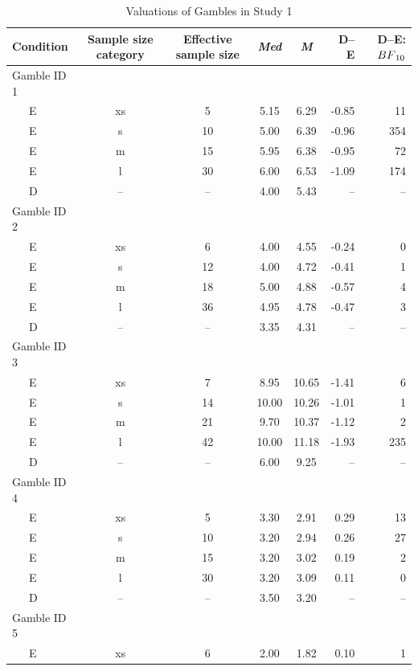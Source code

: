 \documentclass[a4paper, man, floatsintext]{apa6}
\begin{document}
\begin{table}[tbp]
\begin{center}
\begin{threeparttable}
\caption{\label{tab:means_study2}Valuations of Gambles in Study 1}
\begin{tabular}{lccccrr}
\toprule
Condition & Sample size category & Effective sample size & \textit{Med} & \textit{M} & D--E & D--E:$BF\textsubscript{10}$\\
\midrule
Gamble ID 1 &  &  &  &  &  & \\
\ \ \ E & xs & 5 & 5.15 & 6.29 & -0.85 & 11\\
\ \ \ E & s & 10 & 5.00 & 6.39 & -0.96 & 354\\
\ \ \ E & m & 15 & 5.95 & 6.38 & -0.95 & 72\\
\ \ \ E & l & 30 & 6.00 & 6.53 & -1.09 & 174\\
\ \ \ D & -- & -- & 4.00 & 5.43 & -- & --\\
Gamble ID 2 &  &  &  &  &  & \\
\ \ \ E & xs & 6 & 4.00 & 4.55 & -0.24 & 0\\
\ \ \ E & s & 12 & 4.00 & 4.72 & -0.41 & 1\\
\ \ \ E & m & 18 & 5.00 & 4.88 & -0.57 & 4\\
\ \ \ E & l & 36 & 4.95 & 4.78 & -0.47 & 3\\
\ \ \ D & -- & -- & 3.35 & 4.31 & -- & --\\
Gamble ID 3 &  &  &  &  &  & \\
\ \ \ E & xs & 7 & 8.95 & 10.65 & -1.41 & 6\\
\ \ \ E & s & 14 & 10.00 & 10.26 & -1.01 & 1\\
\ \ \ E & m & 21 & 9.70 & 10.37 & -1.12 & 2\\
\ \ \ E & l & 42 & 10.00 & 11.18 & -1.93 & 235\\
\ \ \ D & -- & -- & 6.00 & 9.25 & -- & --\\
Gamble ID 4 &  &  &  &  &  & \\
\ \ \ E & xs & 5 & 3.30 & 2.91 & 0.29 & 13\\
\ \ \ E & s & 10 & 3.20 & 2.94 & 0.26 & 27\\
\ \ \ E & m & 15 & 3.20 & 3.02 & 0.19 & 2\\
\ \ \ E & l & 30 & 3.20 & 3.09 & 0.11 & 0\\
\ \ \ D & -- & -- & 3.50 & 3.20 & -- & --\\
Gamble ID 5 &  &  &  &  &  & \\
\ \ \ E & xs & 6 & 2.00 & 1.82 & 0.10 & 1\\

\end{tabular}
\end{threeparttable}
\end{center}
\end{table}
\end{document}
